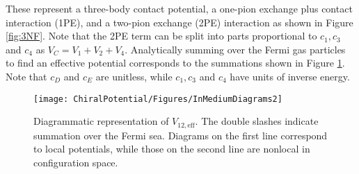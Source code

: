 These represent a three-body contact potential, a one-pion exchange plus contact interaction (1PE), and a two-pion exchange (2PE) interaction as shown in Figure \ref{fig:3NF}. Note that the 2PE term can be split into parts proportional to $c_1, c_3$ and $c_4$ as $V_C=V_1+V_2+V_4$. Analytically summing over the Fermi gas particles to find an effective potential corresponds to the summations shown in Figure \ref{fig:eff-diagram}. Note that $c_D$ and $c_E$ are unitless, while $c_1, c_3$ and $c_4$ have units of inverse energy. 
\begin{figure}\centering
\texttt{[image: ChiralPotential/Figures/InMediumDiagrams2]}
\caption[Diagrammatic representation of $V_{12,\text{eff}}$]{\label{fig:eff-diagram} Diagrammatic representation of $V_{12,\text{eff}}$. The double slashes indicate summation over the Fermi sea. Diagrams on the first line correspond to local potentials, while those on the second line are nonlocal in configuration space.}
\end{figure}

